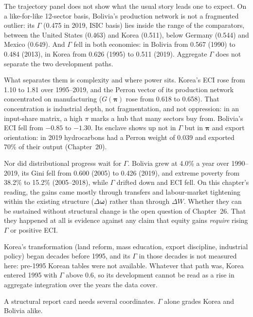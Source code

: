\documentclass[../structural_economics_book.tex]{subfiles}
\begin{document}
\begin{keyinsight}
The trajectory panel does not show what the usual story leads one to expect. On a like-for-like 12-sector basis, Bolivia's production network is not a fragmented outlier: its $\Gamma$ (0.475 in 2019, ISIC basis) lies inside the range of the comparators, between the United States (0.463) and Korea (0.511), below Germany (0.544) and Mexico (0.649). And $\Gamma$ fell in both economies: in Bolivia from 0.567 (1990) to 0.484 (2013), in Korea from 0.626 (1995) to 0.511 (2019). Aggregate $\Gamma$ does not separate the two development paths.

What separates them is complexity and where power sits. Korea's ECI rose from 1.10 to 1.81 over 1995--2019, and the Perron vector of its production network concentrated on manufacturing ($G(\boldsymbol{\pi})$ rose from 0.618 to 0.658). That concentration is industrial depth, not fragmentation, and not oppression: in an input-share matrix, a high $\pi$ marks a hub that many sectors buy from. Bolivia's ECI fell from $-0.85$ to $-1.30$. Its enclave shows up not in $\Gamma$ but in $\boldsymbol{\pi}$ and export orientation: in 2019 hydrocarbons had a Perron weight of 0.039 and exported 70\% of their output (Chapter~20).

Nor did distributional progress wait for $\Gamma$. Bolivia grew at 4.0\% a year over 1990--2019, its Gini fell from 0.600 (2005) to 0.426 (2019), and extreme poverty from 38.2\% to 15.2\% (2005--2018), while $\Gamma$ drifted down and ECI fell. On this chapter's reading, the gains came mostly through transfers and labour-market tightening within the existing structure ($\Delta\boldsymbol{\omega}$) rather than through $\Delta W$. Whether they can be sustained without structural change is the open question of Chapter~26. That they happened at all is evidence against any claim that equity gains \emph{require} rising $\Gamma$ or positive ECI.

Korea's transformation (land reform, mass education, export discipline, industrial policy) began decades before 1995, and its $\Gamma$ in those decades is not measured here: pre-1995 Korean tables were not available. Whatever that path was, Korea entered 1995 with $\Gamma$ above 0.6, so its development cannot be read as a rise in aggregate integration over the years the data cover.

A structural report card needs several coordinates. $\Gamma$ alone grades Korea and Bolivia alike.
\end{keyinsight}
\end{document}
